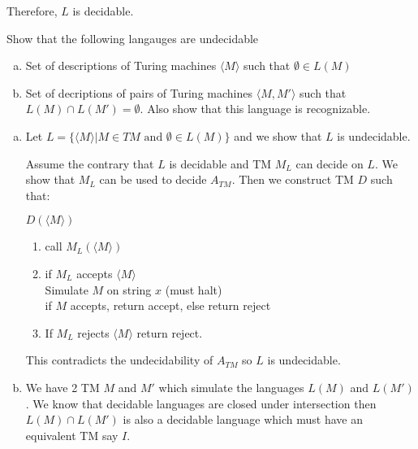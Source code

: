 \documentclass[12pt]{exam}
\begin{document}
\begin{questions}
\begin{solution}
    Therefore, $L$ is decidable.
  \end{solution}

  \question{}
  Show that the following langauges are undecidable

  \begin{enumerate}[a)]
    \item Set of descriptions of Turing machines $\langle M \rangle$ such that $\emptyset \in L(M)$

    \item Set of decriptions of pairs of Turing machines $\langle M, M' \rangle$ such that $L(M)\cap L(M') = \emptyset$.
          Also show that this language is recognizable.

  \end{enumerate}


  \begin{solution}

    \begin{enumerate}[a)]
      \item Let $L=\{\langle M\rangle| M\in TM \text{ and } \emptyset \in L(M)\}$ and we show that $L$ is undecidable.

            Assume the contrary that $L$ is decidable and TM $M_{L}$ can decide on $L$. We show that $M_{L}$ can be used to decide $A_{TM}$. Then we construct TM $D$ such that:

            $D(\langle M\rangle)$
            \begin{enumerate}[1.]

              \item call $M_{L}(\langle M \rangle)$
              \item if $M_{L}$ accepts $\langle M \rangle$\\
                    \null\quad Simulate $M$ on string $x$ (must halt)\\
                    \null \quad if $M$ accepts, return accept, else return reject
              \item If $M_{L}$ rejects $\langle M\rangle$ return reject.
            \end{enumerate}

            This contradicts the undecidability of $A_{TM}$ so $L$ is undecidable.


      \item We have 2 TM $M$ and $M'$ which simulate the languages $L(M)$ and $L(M')$. We know that decidable languages are closed under intersection then $L(M)\cap L(M')$ is also a decidable language which must have an equivalent TM say $I$.


\end{enumerate}
\end{solution}
\end{questions}
\end{document}
